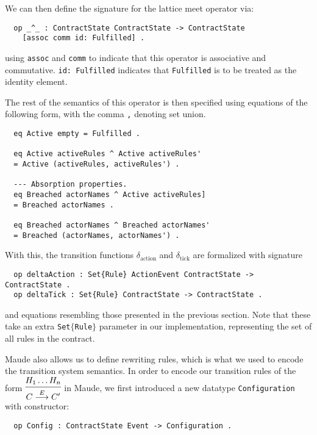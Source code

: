 \documentclass{article}
\begin{document}
We can then define the signature for the lattice meet operator via:

\begin{lstlisting}
  op _^_ : ContractState ContractState -> ContractState
    [assoc comm id: Fulfilled] .
\end{lstlisting}

using \texttt{assoc} and \texttt{comm} to indicate that this operator is
associative and commutative.
\texttt{id: Fulfilled} indicates that \texttt{Fulfilled}
is to be treated as the identity element.

The rest of the semantics of this operator is then specified using equations of
the following form, with the comma \texttt{,} denoting set union.
\begin{lstlisting}
  eq Active empty = Fulfilled .

  eq Active activeRules ^ Active activeRules'
  = Active (activeRules, activeRules') .

  --- Absorption properties.
  eq Breached actorNames ^ Active activeRules]
  = Breached actorNames .

  eq Breached actorNames ^ Breached actorNames'
  = Breached (actorNames, actorNames') .
\end{lstlisting}

With this, the transition functions $\delta_\text{action}$ and
$\delta_\text{tick}$ are formalized with signature

\begin{lstlisting}
  op deltaAction : Set{Rule} ActionEvent ContractState -> ContractState .
  op deltaTick : Set{Rule} ContractState -> ContractState .
\end{lstlisting}

and equations resembling those presented in the previous section.
Note that these take an extra \texttt{Set$\{$Rule$\}$} parameter in our implementation,
representing the set of all rules in the contract.

Maude also allows us to define rewriting rules, which is what we used to encode
the transition system semantics.
In order to encode our transition rules of the form
$\begin{prooftree}
  \hypo{H_1 \dots H_n}
  \infer1{C \overset{E}{\longrightarrow} C'} \end{prooftree}$
in Maude, we first introduced a new datatype
\texttt{Configuration} with constructor:

\begin{lstlisting}
  op Config : ContractState Event -> Configuration .
\end{lstlisting}
\end{document}
